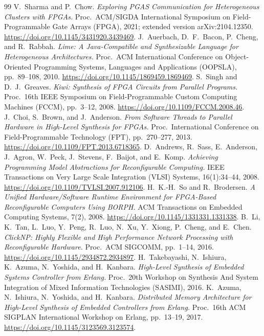 \documentclass[11pt]{article}
\begin{document}
\begin{thebibliography}{99}
 V.~Sharma and P.~Chow. \emph{Exploring PGAS Communication
  for Heterogeneous Clusters with FPGAs.} Proc.\ ACM/SIGDA International
  Symposium on Field-Programmable Gate Arrays (FPGA), 2021; extended version
  arXiv:2104.12350. \url{https://doi.org/10.1145/3431920.3439469}.
 J.~Auerbach, D.~F.~Bacon, P.~Cheng, and R.~Rabbah.
  \emph{Lime: A Java-Compatible and Synthesizable Language for Heterogeneous
  Architectures.} Proc.\ ACM International Conference on Object-Oriented
  Programming Systems, Languages and Applications (OOPSLA), pp.~89--108, 2010.
  \url{https://doi.org/10.1145/1869459.1869469}.
 S.~Singh and D.~J.~Greaves. \emph{Kiwi: Synthesis of FPGA
  Circuits from Parallel Programs.} Proc.\ 16th IEEE Symposium on
  Field-Programmable Custom Computing Machines (FCCM), pp.~3--12, 2008.
  \url{https://doi.org/10.1109/FCCM.2008.46}.
 J.~Choi, S.~Brown, and J.~Anderson. \emph{From Software
  Threads to Parallel Hardware in High-Level Synthesis for FPGAs.} Proc.\
  International Conference on Field-Programmable Technology (FPT),
  pp.~270--277, 2013. \url{https://doi.org/10.1109/FPT.2013.6718365}.
\bibitem{hthreads2008} D.~Andrews, R.~Sass, E.~Anderson, J.~Agron, W.~Peck,
  J.~Stevens, F.~Baijot, and E.~Komp. \emph{Achieving Programming Model
  Abstractions for Reconfigurable Computing.} IEEE Transactions on Very Large
  Scale Integration (VLSI) Systems, 16(1):34--44, 2008.
  \url{https://doi.org/10.1109/TVLSI.2007.912106}.
 H.~K.-H.~So and R.~Brodersen. \emph{A Unified
  Hardware/Software Runtime Environment for FPGA-Based Reconfigurable Computers
  Using BORPH.} ACM Transactions on Embedded Computing Systems, 7(2), 2008.
  \url{https://doi.org/10.1145/1331331.1331338}.
 B.~Li, K.~Tan, L.~Luo, Y.~Peng, R.~Luo, N.~Xu,
  Y.~Xiong, P.~Cheng, and E.~Chen. \emph{ClickNP: Highly Flexible and High
  Performance Network Processing with Reconfigurable Hardware.} Proc.\ ACM
  SIGCOMM, pp.~1--14, 2016. \url{https://doi.org/10.1145/2934872.2934897}.
\bibitem{erlanghls2016} H.~Takebayashi, N.~Ishiura, K.~Azuma, N.~Yoshida, and
  H.~Kanbara. \emph{High-Level Synthesis of Embedded Systems Controller from
  Erlang.} Proc.\ 20th Workshop on Synthesis And System Integration of Mixed
  Information Technologies (SASIMI), 2016.
 K.~Azuma, N.~Ishiura, N.~Yoshida, and H.~Kanbara.
  \emph{Distributed Memory Architecture for High-Level Synthesis of Embedded
  Controllers from Erlang.} Proc.\ 16th ACM SIGPLAN International Workshop on
  Erlang, pp.~13--19, 2017. \url{https://doi.org/10.1145/3123569.3123574}.

\end{thebibliography}
\end{document}
